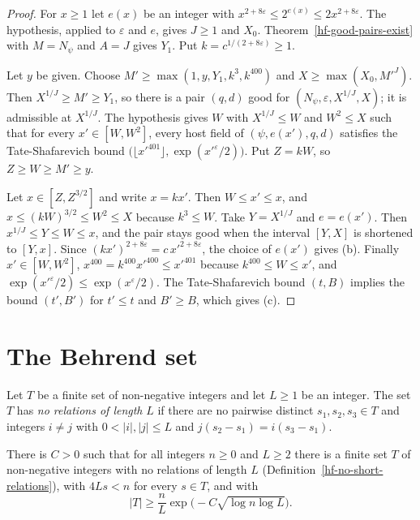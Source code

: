 \begin{proof}
For $x\geq1$ let $e(x)$ be an integer with $x^{2+8\varepsilon}\leq2^{e(x)}\leq2x^{2+8\varepsilon}$.
The hypothesis, applied to $\varepsilon$ and $e$, gives $J\geq1$ and $X_0$. Theorem~\ref{hf-good-pairs-exist}
with $M=N_\psi$ and $A=J$ gives $Y_1$. Put $k=c^{1/(2+8\varepsilon)}\geq1$.

Let $y$ be given. Choose $M'\geq\max(1,y,Y_1,k^3,k^{400})$ and $X\geq\max(X_0,M'^J)$. Then
$X^{1/J}\geq M'\geq Y_1$, so there is a pair $(q,d)$ good for $(N_\psi,\varepsilon,X^{1/J},X)$; it is
admissible at $X^{1/J}$. The hypothesis gives $W$ with $X^{1/J}\leq W$ and $W^2\leq X$ such that for
every $x'\in[W,W^2]$, every host field of $(\psi,e(x'),q,d)$ satisfies the Tate-Shafarevich bound
$\bigl(\lfloor x'^{401}\rfloor,\exp(x'^{\varepsilon}/2)\bigr)$. Put $Z=kW$, so $Z\geq W\geq M'\geq y$.

Let $x\in[Z,Z^{3/2}]$ and write $x=kx'$. Then $W\leq x'\leq x$, and $x\leq(kW)^{3/2}\leq W^2\leq X$
because $k^3\leq W$. Take $Y=X^{1/J}$ and $e=e(x')$. Then $x^{1/J}\leq Y\leq W\leq x$, and the pair
stays good when the interval $[Y,X]$ is shortened to $[Y,x]$. Since
$(kx')^{2+8\varepsilon}=c\,x'^{2+8\varepsilon}$, the choice of $e(x')$ gives (b). Finally
$x'\in[W,W^2]$, $x^{400}=k^{400}x'^{400}\leq x'^{401}$ because $k^{400}\leq W\leq x'$, and
$\exp(x'^\varepsilon/2)\leq\exp(x^\varepsilon/2)$. The Tate-Shafarevich bound $(t,B)$ implies the
bound $(t',B')$ for $t'\leq t$ and $B'\geq B$, which gives (c).
\end{proof}

\section{The Behrend set}\label{section-hf-behrend}

\begin{definition}\label{hf-no-short-relations}
Let $T$ be a finite set of non-negative integers and let $L\geq1$ be an integer. The set $T$ has
\emph{no relations of length} $L$ if there are no pairwise distinct $s_1,s_2,s_3\in T$ and integers
$i\neq j$ with $0<|i|,|j|\leq L$ and $j(s_2-s_1)=i(s_3-s_1)$.
\end{definition}

\begin{theorem}\label{hf-behrend-set}
There is $C>0$ such that for all integers $n\geq0$ and $L\geq2$ there is a finite set $T$ of
non-negative integers with no relations of length $L$ (Definition~\ref{hf-no-short-relations}),
with $4Ls<n$ for every $s\in T$, and with
\[
 |T|\geq\frac nL\exp\bigl(-C\sqrt{\log n\log L}\bigr).
\]
\end{theorem}

